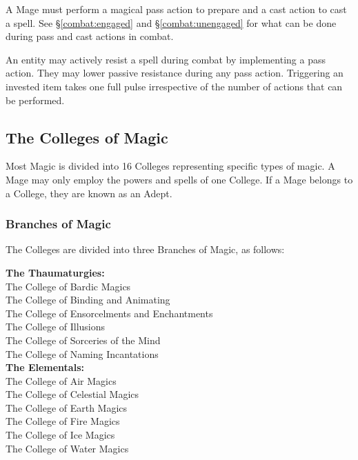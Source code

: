 \begin{multicols*}{3}
A Mage must perform a magical pass action to prepare and a cast action
to cast a spell.  See \S\ref{combat:engaged} and
\S\ref{combat:unengaged} for what can be done during pass and cast
actions in combat.

An entity may actively resist a spell during combat by implementing a
pass action. They may lower passive resistance during any pass action.
Triggering an invested item takes one full pulse irrespective of the
number of actions that can be performed.

\subsection{The Colleges of Magic}
\label{magic:colleges}

Most Magic is divided into 16 Colleges representing specific types of
magic. A Mage may only employ the powers and spells of one College. If
a Mage belongs to a College, they are known as an Adept.

\subsubsection{Branches of Magic}

The Colleges are divided into three Branches of Magic, as follows:

\begin{flushleft} {\bf The Thaumaturgies:} \\

The College of Bardic Magics \\
The College of Binding and Animating \\
The College of Ensorcelments and Enchantments \\
The College of Illusions \\
The College of Sorceries of the Mind \\
The College of Naming Incantations \\

{\bf The Elementals:} \\
The College of Air Magics \\
The College of Celestial Magics \\
The College of Earth Magics \\
The College of Fire Magics \\
The College of Ice Magics \\
The College of Water Magics \\


\end{flushleft}
\end{multicols*}
